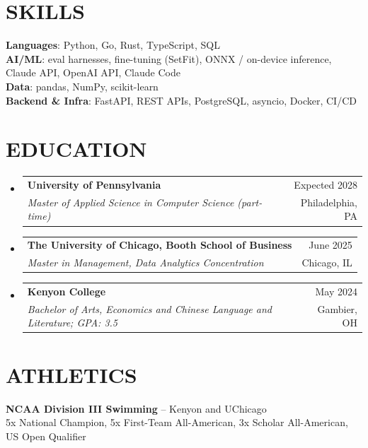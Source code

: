 \documentclass[letterpaper,11pt]{article}
\makeatletter
\newcommand{\resumeSubheading}[4]{
  \vspace{-1pt}\item
    \begin{tabular*}{\textwidth}[t]{l@{\extracolsep{\fill}}r}
      \textbf{#1} & {\color{dark-grey}\small #2}\vspace{1pt}\\
      \textit{#3} & {\color{dark-grey} \small #4}\\
    \end{tabular*}\vspace{-4pt}
}
\newcommand{\resumeSubHeadingListStart}{\begin{itemize}[leftmargin=0in, label={}]}
\newcommand{\resumeSubHeadingListEnd}{\end{itemize}}
\makeatother
\begin{document}
\section{SKILLS}
 \begin{itemize}[leftmargin=0in, label={}]
    \small{\item{
     \textbf{Languages}{: Python, Go, Rust, TypeScript, SQL}\vspace{2pt} \\
     \textbf{AI/ML}{: eval harnesses, fine-tuning (SetFit), ONNX / on-device inference, Claude API, OpenAI API, Claude Code}\vspace{2pt} \\
     \textbf{Data}{: pandas, NumPy, scikit-learn}\vspace{2pt} \\
     \textbf{Backend \& Infra}{: FastAPI, REST APIs, PostgreSQL, asyncio, Docker, CI/CD}
    }}
 \end{itemize}

\section{EDUCATION}
  \resumeSubHeadingListStart
    \resumeSubheading
      {University of Pennsylvania}{Expected 2028}
      {Master of Applied Science in Computer Science (part-time)}{Philadelphia, PA}
    \resumeSubheading
      {The University of Chicago, Booth School of Business}{June 2025}
      {Master in Management, Data Analytics Concentration}{Chicago, IL}
    \resumeSubheading
      {Kenyon College}{May 2024}
      {Bachelor of Arts, Economics and Chinese Language and Literature; GPA: 3.5}{Gambier, OH}
  \resumeSubHeadingListEnd

\section{ATHLETICS}
 \begin{itemize}[leftmargin=0in, label={}]
    \small{\item{
     \textbf{NCAA Division III Swimming} -- Kenyon and UChicago \\
     5x National Champion, 5x First-Team All-American, 3x Scholar All-American, US Open Qualifier
    }}
 \end{itemize}

\end{document}

